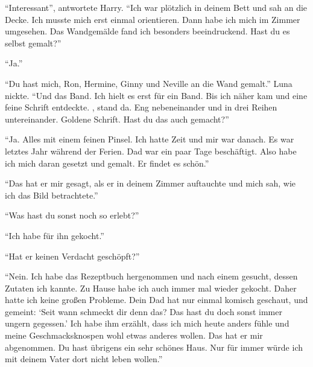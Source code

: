 \enquote{Interessant}, antwortete Harry. \enquote{Ich war plötzlich in deinem Bett und sah an die Decke. Ich musste mich erst einmal orientieren. Dann habe ich mich im Zimmer umgesehen. Das Wandgemälde fand ich besonders beeindruckend. Hast du es selbst gemalt?}

\enquote{Ja.}

\enquote{Du hast mich, Ron, Hermine, Ginny und Neville an die Wand gemalt.} Luna nickte. \enquote{Und das Band. Ich hielt es erst für ein Band. Bis ich näher kam und eine feine Schrift entdeckte. , stand da. Eng nebeneinander und in drei Reihen untereinander. Goldene Schrift. Hast du das auch gemacht?}

\enquote{Ja. Alles mit einem feinen Pinsel. Ich hatte Zeit und mir war danach. Es war letztes Jahr während der Ferien. Dad war ein paar Tage beschäftigt. Also habe ich mich daran gesetzt und gemalt. Er findet es schön.}

\enquote{Das hat er mir gesagt, als er in deinem Zimmer auftauchte und mich sah, wie ich das Bild betrachtete.}

\enquote{Was hast du sonst noch so erlebt?}

\enquote{Ich habe für ihn gekocht.}

\enquote{Hat er keinen Verdacht geschöpft?}

\enquote{Nein. Ich habe das Rezeptbuch hergenommen und nach einem gesucht, dessen Zutaten ich kannte. Zu Hause habe ich auch immer mal wieder gekocht. Daher hatte ich keine großen Probleme. Dein Dad hat nur einmal komisch geschaut, und gemeint: \enquote{Seit wann schmeckt dir denn das? Das hast du doch sonst immer ungern gegessen.} Ich habe ihm erzählt, dass ich mich heute anders fühle und meine Geschmacksknospen wohl etwas anderes wollen. Das hat er mir abgenommen. \gst Du hast übrigens ein sehr schönes Haus. Nur für immer würde ich mit deinem Vater dort nicht leben wollen.}

